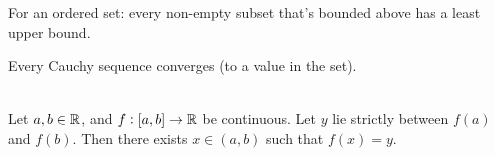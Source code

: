 \documentclass[12pt]{article}
\begin{document}
\begin{definition*}
  For an ordered set: every non-empty subset that's bounded above has a least upper bound.
\end{definition*}


\begin{definition*}
  Every Cauchy sequence converges (to a value in the set).
\end{definition*}




\begin{theorem*}~\\
  Let $a, b \in \mathbb{R}$, and $f:[a, b] \to \mathbb{R}$ be continuous. Let $y$ lie strictly between $f(a)$ and
  $f(b)$. Then there exists $x \in (a, b)$ such that $f(x) = y$.
\end{theorem*}
\end{document}
